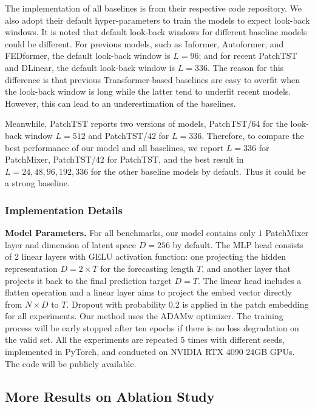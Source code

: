 \documentclass{article} \usepackage{iclr2024_conference,times}
\begin{document}
The implementation of all baselines is from their respective code repository. We also adopt their default hyper-parameters to train the models to expect look-back windows. It is noted that default look-back windows for different baseline models could be different. For previous models, such as Informer, Autoformer, and FEDformer, the default look-back window is $L=96$; and for recent PatchTST and DLinear, the default look-back window is $L=336$. The reason for this difference is that previous Transformer-based baselines are easy to overfit when the look-back window is long while the latter tend to underfit recent models. However, this can lead to an underestimation of the baselines. 

Meanwhile, PatchTST\citep{patchtst} reports two versions of models, PatchTST/64 for the look-back window $L=512$ and PatchTST/42 for $L=336$. Therefore, to compare the best performance of our model and all baselines, we report $L=336$ for PatchMixer, PatchTST/42 for PatchTST, and the best result in $L={24,48,96,192,336}$ for the other baseline models by default. Thus it could be a strong baseline.



\subsubsection{Implementation Details}
\label{sec::implementation details}

\textbf{Model Parameters.} For all benchmarks, our model contains only $1$ PatchMixer layer and dimension of latent space $D=256$ by default. The MLP head consists of 2 linear layers with GELU \citep{gelu} activation function: one projecting the hidden representation $D= 2 \times T$ for the forecasting length $T$, and another layer that projects it back to the final prediction target $D=T$. The linear head includes a flatten operation and a linear layer aims to project the embed vector directly from $N \times D$ to $T$. Dropout with probability $0.2$ is applied in the patch embedding for all experiments. Our method uses the ADAMw optimizer. The training process will be early stopped after ten epochs if there is no loss degradation on the valid set. All the experiments are repeated 5 times with different seeds, implemented in PyTorch, and conducted on NVIDIA RTX 4090 24GB GPUs. The code will be publicly available.





\subsection{More Results on Ablation Study}
\label{sec::more_ablation}
\end{document}

